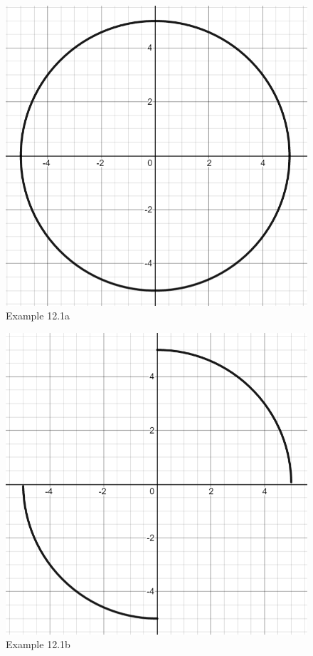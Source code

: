  \begin{figure}[h!]
 \centering
    \includegraphics[scale=0.45]{images/implicitDiff/implicit12_1a.PNG}
    \caption{Example 12.1a}
    \end{figure}
 \vspace{1cm}   
    \begin{figure}[h!]
 \centering
    \includegraphics[scale=0.45]{images/implicitDiff/implicit12_1b.PNG}
    \caption{Example 12.1b}
    \end{figure}
